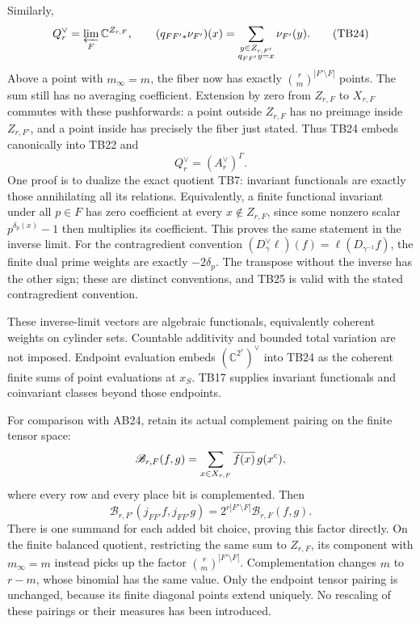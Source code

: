 Similarly,
\[
Q_r^\vee=\varprojlim_F\mathbb C^{Z_{r,F}},
\qquad
(q_{FF'*}\nu_{F'})(x)
  =\sum_{\substack{y\in Z_{r,F'}\\q_{FF'}y=x}}\nu_{F'}(y).
\tag{TB24}
\]
Above a point with \(m_\infty=m\), the fiber now has exactly
\(\binom rm^{|F'\setminus F|}\) points. The sum still has no
averaging coefficient.
Extension by zero from \(Z_{r,F}\) to \(X_{r,F}\) commutes with
these pushforwards: a point outside \(Z_{r,F}\) has no preimage
inside \(Z_{r,F'}\), and a point inside has precisely the fiber
just stated. Thus TB24 embeds canonically into TB22 and
\[
Q_r^\vee=(A_r^\vee)^\Gamma.
\tag{TB25}
\]
One proof is to dualize the exact quotient TB7: invariant
functionals are exactly those annihilating all its relations.
Equivalently, a finite functional invariant under all \(p\in F\)
has zero coefficient at every \(x\notin Z_{r,F}\), since some
nonzero scalar \(p^{\delta_p(x)}-1\) then multiplies its coefficient.
This proves the same statement in the inverse limit.
For the contragredient convention
\((D_\gamma^\vee\ell)(f)=\ell(D_{\gamma^{-1}}f)\), the finite
dual prime weights are exactly \(-2\delta_p\).
The transpose without the inverse has the other sign; these are
distinct conventions, and TB25 is valid with the stated
contragredient convention.

These inverse-limit vectors are algebraic functionals, equivalently
coherent weights on cylinder sets. Countable additivity and bounded
total variation are not imposed. Endpoint evaluation embeds
\((\mathbb C^{2^r})^\vee\) into TB24 as the coherent finite sums
of point evaluations at \(x_S\). TB17 supplies invariant
functionals and coinvariant classes beyond those endpoints.

For comparison with AB24, retain its actual complement pairing
on the finite tensor space:
\[
\mathscr B_{r,F}(f,g)
 =\sum_{x\in X_{r,F}}\overline{f(x)}\,g(x^{\rm c}),
\]
where every row and every place bit is complemented. Then
\[
\mathscr B_{r,F'}(j_{FF'}f,j_{FF'}g)
 =2^{r|F'\setminus F|}\mathscr B_{r,F}(f,g).
\tag{TB26}
\]
There is one summand for each added bit choice, proving this
factor directly. On the finite balanced quotient, restricting
the same sum to \(Z_{r,F}\), its component with \(m_\infty=m\)
instead picks up the factor
\(\binom rm^{|F'\setminus F|}\). Complementation changes \(m\)
to \(r-m\), whose binomial has the same value.
Only the endpoint tensor pairing is unchanged, because its
finite diagonal points extend uniquely. No rescaling of these
pairings or their measures has been introduced.

